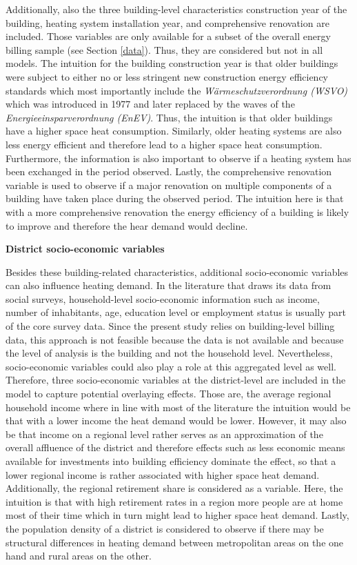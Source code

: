 \documentclass[12pt,twoside]{reedthesis}
\begin{document}
Additionally, also the three building-level characteristics construction year of the building, heating system installation year, and comprehensive renovation are included. Those variables are only available for a subset of the overall energy billing sample (see Section \ref{data}). Thus, they are considered but not in all models. The intuition for the building construction year is that older buildings were subject to either no or less stringent new construction energy efficiency standards which most importantly include the \emph{Wärmeschutzverordnung (WSVO)} which was introduced in 1977 and later replaced by the waves of the \emph{Energieeinsparverordnung (EnEV)}. Thus, the intuition is that older buildings have a higher space heat consumption. Similarly, older heating systems are also less energy efficient and therefore lead to a higher space heat consumption. Furthermore, the information is also important to observe if a heating system has been exchanged in the period observed. Lastly, the comprehensive renovation variable is used to observe if a major renovation on multiple components of a building have taken place during the observed period. The intuition here is that with a more comprehensive renovation the energy efficiency of a building is likely to improve and therefore the hear demand would decline.

\textbf{District socio-economic variables}

Besides these building-related characteristics, additional socio-economic variables can also influence heating demand. In the literature that draws its data from social surveys, household-level socio-economic information such as income, number of inhabitants, age, education level or employment status is usually part of the core survey data. Since the present study relies on building-level billing data, this approach is not feasible because the data is not available and because the level of analysis is the building and not the household level. Nevertheless, socio-economic variables could also play a role at this aggregated level as well. Therefore, three socio-economic variables at the district-level are included in the model to capture potential overlaying effects. Those are, the average regional household income where in line with most of the literature the intuition would be that with a lower income the heat demand would be lower. However, it may also be that income on a regional level rather serves as an approximation of the overall affluence of the district and therefore effects such as less economic means available for investments into building efficiency dominate the effect, so that a lower regional income is rather associated with higher space heat demand. Additionally, the regional retirement share is considered as a variable. Here, the intuition is that with high retirement rates in a region more people are at home most of their time which in turn might lead to higher space heat demand. Lastly, the population density of a district is considered to observe if there may be structural differences in heating demand between metropolitan areas on the one hand and rural areas on the other.
\end{document}
